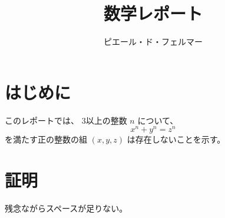 \documentclass[a4paper,11pt]{jsreport}
\begin{document}
\title{数学レポート}
\author{ピエール・ド・フェルマー}

\maketitle  \section{はじめに}

このレポートでは、 3以上の整数 $n$ について、
\[ x^n + y^n = z^n\]
を満たす正の整数の組 $(x, y, z)$ は存在しないことを示す。

\section{証明}
残念ながらスペースが足りない。
\end{document}
